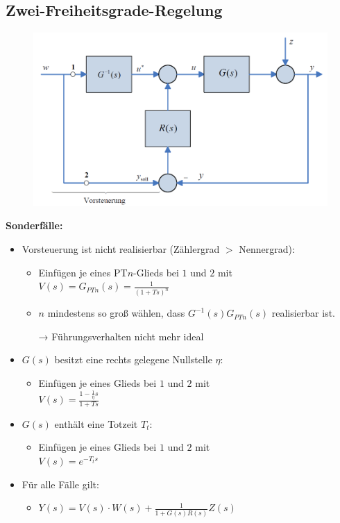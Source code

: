 \documentclass[10pt,a4paper]{article}
\begin{document}
\subsection{Zwei-Freiheitsgrade-Regelung}

\begin{figure}[H]
	\includegraphics[width=0.5\columnwidth]{imgs/abb7_2.png}
\end{figure}

\textbf{Sonderfälle:}
\begin{itemize}
	\item Vorsteuerung ist nicht realisierbar (Zählergrad $>$ Nennergrad):
	\begin{itemize}
		\item Einfügen je eines PT$n$-Glieds bei $1$ und $2$ mit \\
		$V(s) = G_{PTn}(s) = \frac{1}{(1 + Ts)^n}$
		\item $n$ mindestens so groß wählen, dass $G^{-1}(s)G_{PTn}(s)$ realisierbar ist.
		\item[→] Führungsverhalten nicht mehr ideal
	\end{itemize}
	\item $G(s)$ besitzt eine rechts gelegene Nullstelle $\eta$:
	\begin{itemize}
		\item Einfügen je eines Glieds bei $1$ und $2$ mit \\
		$V(s) = \frac{1 - \frac 1 \eta s}{1 + Ts}$
	\end{itemize}
	\item  $G(s)$ enthält eine Totzeit $T_t$:
	\begin{itemize}
		\item Einfügen je eines Glieds bei $1$ und $2$ mit \\
		$V(s) = e^{-T_ts}$
	\end{itemize}
	\item Für alle Fälle gilt:
	\begin{itemize}
		\item $Y(s) = V(s) ⋅ W(s) + \frac{1}{1 + G(s) R(s)} Z(s)$
	\end{itemize}
	
\end{itemize}
\end{document}
